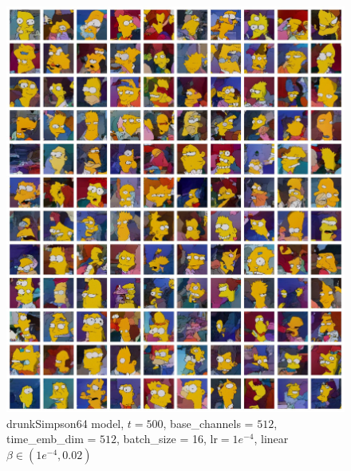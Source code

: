 \documentclass[12pt]{article}
\begin{document}
\begin{figure}[H]
  \centering
  \includegraphics[width=1\textwidth]{simp64ext.jpg}
  \caption{drunkSimpson64 model, $t=500$, base\_channels = $512$, time\_emb\_dim = $512$, batch\_size = 16, lr$=1e^{-4}$, linear $\beta \in(1e^{-4}, 0.02)$}
\end{figure}
\end{document}
